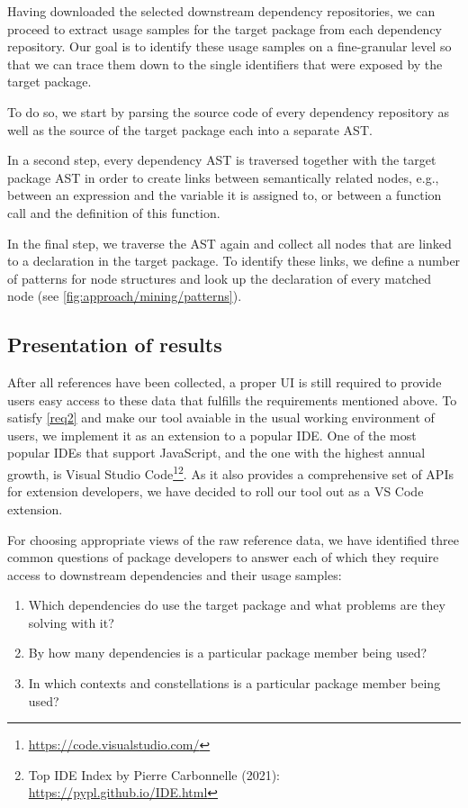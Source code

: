 Having downloaded the selected downstream dependency repositories, we can proceed to extract usage samples for the target package from each dependency repository.
Our goal is to identify these usage samples on a fine-granular level so that we can trace them down to the single identifiers that were exposed by the target package.

To do so, we start by parsing the source code of every dependency repository as well as the source of the target package each into a separate AST.

In a second step, every dependency AST is traversed together with the target package AST in order to create links between semantically related nodes, e.g., between an expression and the variable it is assigned to, or between a function call and the definition of this function.

In the final step, we traverse the AST again and collect all nodes that are linked to a declaration in the target package.
To identify these links, we define a number of patterns for node structures and look up the declaration of every matched node (see \cref{fig:approach/mining/patterns}).

\subsection{Presentation of results}
\label{sec:approach/presentation}

After all references have been collected, a proper UI is still required to provide users easy access to these data that fulfills the requirements mentioned above.
To satisfy \cref{req2} and make our tool avaiable in the usual working environment of users, we implement it as an extension to a popular IDE.
One of the most popular IDEs that support JavaScript, and the one with the highest annual growth, is Visual Studio Code\footnote{\url{https://code.visualstudio.com/}}\footnote{Top IDE Index by Pierre Carbonnelle (2021): \url{https://pypl.github.io/IDE.html}}.
As it also provides a comprehensive set of APIs for extension developers, we have decided to roll our tool out as a VS Code extension.

For choosing appropriate views of the raw reference data, we have identified three common questions of package developers to answer each of which they require access to downstream dependencies and their usage samples:

\begin{enumerate}[label=Q\arabic*]
	\item Which dependencies do use the target package and what problems are they solving with it?
	\item By how many dependencies is a particular package member being used?
	\item In which contexts and constellations is a particular package member being used?
\end{enumerate}

